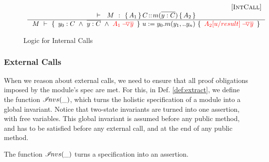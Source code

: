 {%

 
\begin{figure}[hbt]
$\begin{array}{c}
\inferruleSD{\hspace{4.7cm} [\sc{IntCall}]}
	{
	   	\promises M {\mprepost{A_1}{C}{m}{y}{C}{A_2} } %
          		}
	{  \hproves {M} 
						{ \  y_0:C  \ \wedge\ \overline {y:C}\ \wedge \ \red{\PushAS {y}{A_1}} \ } 
						{ \ u:=y_0.m(y_1,.. y_n)\    }
						{ \ \red{ \PushAS {y}{A_2[ u/result]}}  \ }	 
}
\end{array}$
\caption{Logic for Internal Calls}
\label{f:internal:alias:calls}
\end{figure}


\subsubsection{External Calls}

{When we reason about external calls, we need to  ensure that all proof obligations imposed by the module's spec are met.
For this, in Def. \ref{def:extract}, we define the function ${\mathcal I}\!nvs(\_)$,  which turns the holistic specification of a module into a 
global invariant. 
Notice that  two-state invariants are turned into one assertion, with free variables.
This global invariant is assumed before any public method, and  has to be satisfied before any external call, and at the end of any public method.}

\label{s:module-proof}


\begin{definition}
The function ${\mathcal I}\!nvs(\_)$ turns a specification into an assertion.


\end{definition}}
